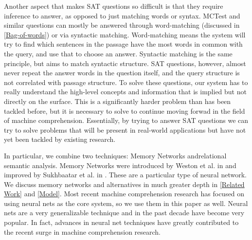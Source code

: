 \documentclass[pageno]{jpaper}
\begin{document}
Another aspect that makes SAT questions so difficult is that they require
inference to answer, as opposed to just matching words or syntax. MCTest and
similar questions can mostly be answered through word-matching (discussed in
\ref{Bag-of-words}) or via syntactic matching. Word-matching means the system
will try to find which sentences in the passage have the most words in common
with the query, and use that to choose an answer. Syntactic matching is the same
principle, but aims to match syntactic structure. SAT questions, however, almost
never repeat the answer words in the question itself, and the query structure is
not correlated with passage structure. To solve these questions, our system has
to really understand the high-level concepts and information that is implied but
not directly on the surface. This is a significantly harder problem than has
been tackled before, but it is necessary to solve to continue moving forwad in
the field of machine comprehension. Essentially, by trying to answer SAT
questions we can try to solve problems that will be present in real-world
applications but have not yet been tackled by existing research.

In particular, we combine two techniques: Memory Networks andrelational semantic
analysis. Memory Networks were introduced by Weston et al. in \cite{Weston2015a}
and improved by Sukhbaatar et al. in \cite{Sukhbaatar2015}. These are a
particular type of neural network. We discuss memory networks and alternatives
in much greater depth in \ref{Related Work} and \ref{Model}. Most recent machine
comprehension research has focused on using neural nets as the core system, so
we use them in this paper as well. Neural nets are a very generalizable
technique and in the past decade have become very popular. In fact, advances in
neural net techniques have greatly contributed to the recent surge in machine
comprehension research.
\end{document}

